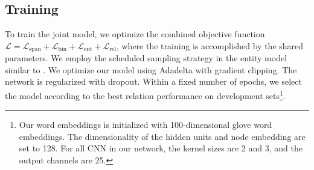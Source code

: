 \subsection{Training}
To train the joint  model,
we optimize the combined objective function 
$\mathcal{L} = \mathcal{L}_\mathrm{span} + \mathcal{L}_\mathrm{bin} + \mathcal{L}_\mathrm{ent} +  \mathcal{L}_\mathrm{rel} $,
where the training is accomplished by the shared parameters.
We employ the scheduled sampling strategy
\cite{bengio2015scheduled}
in the entity model similar to
\cite{miwa-bansal:2016:P16-1}.
We optimize our model using Adadelta \cite{zeiler2012adadelta}
with gradient clipping.
The network is regularized with dropout.
Within a fixed number of epochs,
we select the model according to the best relation performance
on development sets\footnote{
Our word embeddings is initialized
with 100-dimensional glove \cite{pennington-socher-manning:2014:EMNLP2014} word embeddings.
The dimensionality of the hidden units and node embedding are set to 128.
For all CNN in our network, 
the kernel sizes are 2 and 3, 
and the output channels are 25.}.